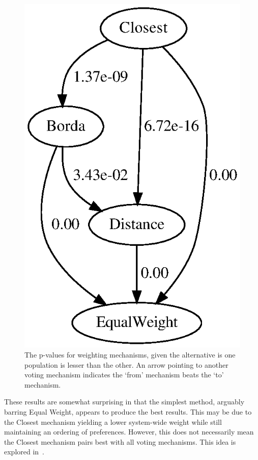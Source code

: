 \begin{figure}[htbp]
    \centering
    \includegraphics[scale=0.75]
    {./content/figures/weighting_mechanisms/weighting-mechanisms-p-values.gv}
    \caption{The p-values for weighting mechanisms, given the alternative is one
    population is lesser than the other.
    An arrow pointing to another voting mechanism indicates the `from' mechanism
    beats the `to' mechanism.}
    \label{fig:weighting-mechanisms-p-values}
\end{figure}

These results are somewhat surprising in that the simplest method, arguably barring
Equal Weight, appears to produce the best results.
This may be due to the Closest mechanism yielding a lower system-wide weight while
still maintaining an ordering of preferences.
However, this does not necessarily mean the Closest mechanism pairs best with all
voting mechanisms.
This idea is explored in~.


